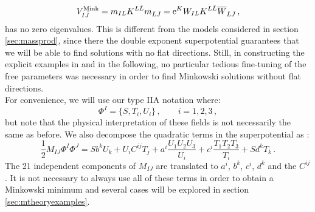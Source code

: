 \documentclass[a4paper,12pt,twoside,openright]{report}
\newcommand{\be}{\begin{equation}}
\newcommand{\ee}{\end{equation}}
\def\rme{{\rm e}}
\begin{document}
\be 
V_{I\bar{J}}^{\text{Mink}} = m_{IL} K^{L\bar{L}} m_{\bar{L}\bar{J}} = \rme^K W_{IL} K^{L\bar{L}} \overline{W}_{\bar{L}\bar{J}}\,,
\ee
has no zero eigenvalues. This is different from the models considered in section \ref{sec:massprod}, since there the double exponent superpotential guarantees that we will be able to find solutions with no flat directions. Still, in constructing the explicit examples in \cite{Cribiori:2019hrb} and in the following, no particular tedious fine-tuning of the free parameters was necessary in order to find Minkowski solutions without flat directions.\\
For convenience, we will use our type IIA notation where:
\be 
\Phi^I = \{S,T_i,U_i\}\,,\qquad i=1,2,3\,,
\ee
but note that the physical interpretation of these fields is not necessarily the same as before. We also decompose the quadratic terms in the superpotential as \cite{Derendinger:2014wwa}:
\be 
\label{eq:mtheoryW}
\frac{1}{2} M_{IJ} \Phi^I \Phi^J = S b^k U_k + U_i C^{ij} T_j + a^i \frac{U_1 U_2 U_3}{U_i} + c^i \frac{T_1 T_2 T_3}{T_i} + S d^k T_k\,.
\ee
The 21 independent components of $M_{IJ}$ are translated to $a^i$, $b^k$, $c^i$, $d^k$ and the $C^{ij}$. It is not necessary to always use all of these terms in order to obtain a Minkowski minimum and several cases will be explored in section \ref{sec:mtheoryexamples}. 
\end{document}
